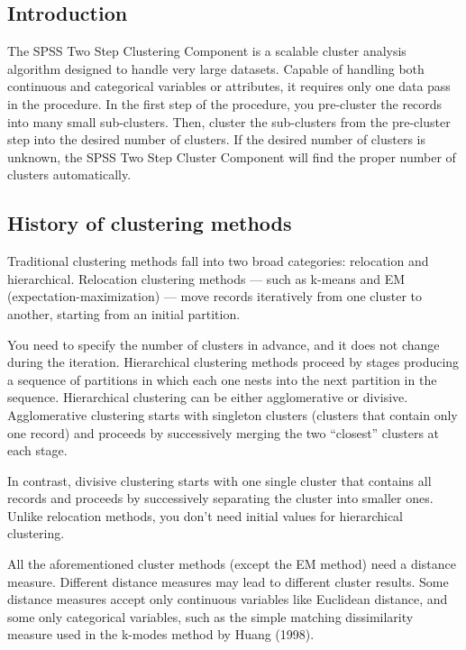 

\subsection{Introduction}

The SPSS Two Step Clustering Component is a scalable cluster analysis algorithm designed
to handle very large datasets. Capable of handling both continuous and categorical variables
or attributes, it requires only one data pass in the procedure. In the first step of the
procedure, you pre-cluster the records into many small sub-clusters. Then, cluster the
sub-clusters from the pre-cluster step into the desired number of clusters. If the desired
number of clusters is unknown, the SPSS Two Step Cluster Component will find the proper
number of clusters automatically.


\subsection{History of clustering methods}
Traditional clustering methods fall into two broad categories: relocation and hierarchical.
Relocation clustering methods — such as k-means and EM (expectation-maximization) —
move records iteratively from one cluster to another, starting from an initial partition.

You need to specify the number of clusters in advance, and it does not change during the iteration. Hierarchical clustering methods proceed by stages producing a sequence of
partitions in which each one nests into the next partition in the sequence. Hierarchical clustering can be either agglomerative or divisive. Agglomerative clustering starts with
singleton clusters (clusters that contain only one record) and proceeds by successively merging the two “closest” clusters at each stage. 

In contrast, divisive clustering starts with one single cluster that contains all records and proceeds by successively separating the
cluster into smaller ones. Unlike relocation methods, you don’t need initial values for hierarchical clustering.

All the aforementioned cluster methods (except the EM method) need a distance measure. Different distance measures may lead to different cluster results. Some distance
measures accept only continuous variables like Euclidean distance, and some only categorical
variables, such as the simple matching dissimilarity measure used in the k-modes
method by Huang (1998).

